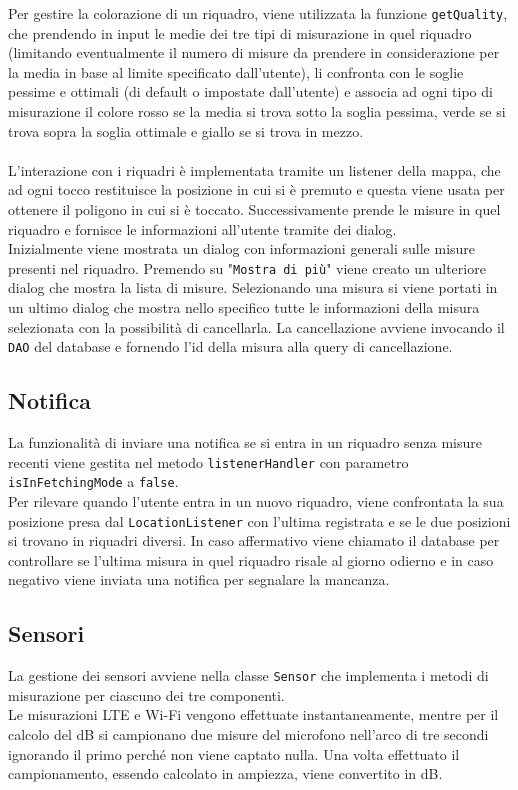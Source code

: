 \documentclass[11pt]{article}
\begin{document}
Per gestire la colorazione di un riquadro, viene utilizzata la funzione \texttt{getQuality}, che prendendo in input le medie dei tre tipi di misurazione in quel riquadro (limitando eventualmente il numero di misure da prendere in considerazione per la media in base al limite specificato dall'utente), li confronta con le soglie pessime e ottimali (di default o impostate dall'utente) e associa ad ogni tipo di misurazione il colore rosso se la media si trova sotto la soglia pessima, verde se si trova sopra la soglia ottimale e giallo se si trova in mezzo. \\ \\
L'interazione con i riquadri è implementata tramite un listener della mappa, che ad ogni tocco restituisce la posizione in cui si è premuto e questa viene usata per ottenere il poligono in cui si è toccato. Successivamente prende le misure in quel riquadro e fornisce le informazioni all'utente tramite dei dialog. \\
Inizialmente viene mostrata un dialog con informazioni generali sulle misure presenti nel riquadro. Premendo su "\texttt{Mostra di più}" viene creato un ulteriore dialog che mostra la lista di misure. Selezionando una misura si viene portati in un ultimo dialog che mostra nello specifico tutte le informazioni della misura selezionata con la possibilità di cancellarla. La cancellazione avviene invocando il \texttt{DAO} del database e fornendo l'id della misura alla query di cancellazione.
\subsection{Notifica}
\label{sec:notifica}
La funzionalità di inviare una notifica se si entra in un riquadro senza misure recenti viene gestita nel metodo \texttt{listenerHandler} con parametro \texttt{isInFetchingMode} a \texttt{false}. \\
Per rilevare quando l'utente entra in un nuovo riquadro, viene confrontata la sua posizione presa dal \texttt{LocationListener} con l'ultima registrata e se le due posizioni si trovano in riquadri diversi. In caso affermativo viene chiamato il database per controllare se l'ultima misura in quel riquadro risale al giorno odierno e in caso negativo viene inviata una notifica per segnalare la mancanza.
\subsection{Sensori}
La gestione dei sensori avviene nella classe \texttt{Sensor} che implementa i metodi di misurazione per ciascuno dei tre componenti. \\
Le misurazioni LTE e Wi-Fi vengono effettuate instantaneamente, mentre per il calcolo del dB si campionano due misure del microfono nell'arco di tre secondi ignorando il primo perché non viene captato nulla. Una volta effettuato il campionamento, essendo calcolato in ampiezza, viene convertito in dB.
\pagebreak
\end{document}
